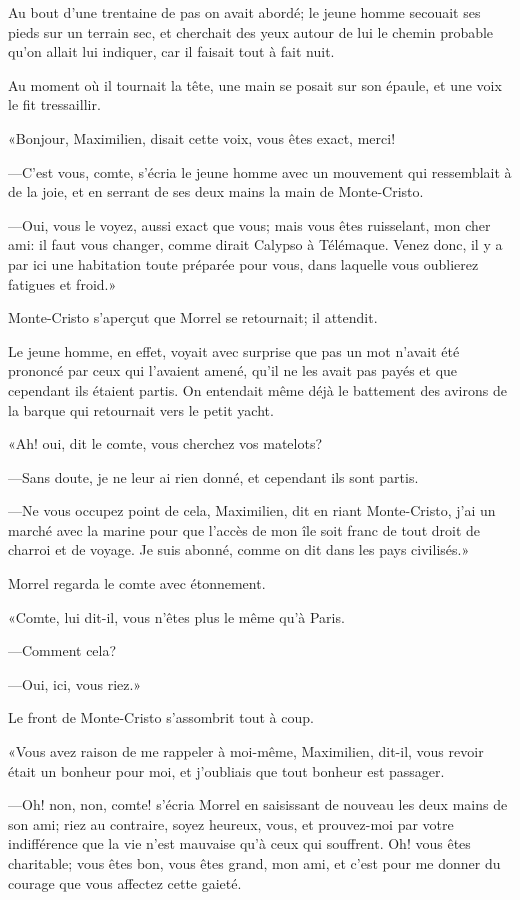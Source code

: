 Au bout d'une trentaine de pas on avait abordé; le jeune homme secouait ses pieds sur un terrain sec, et cherchait des yeux autour de lui le chemin probable qu'on allait lui indiquer, car il faisait tout à fait nuit. 

Au moment où il tournait la tête, une main se posait sur son épaule, et une voix le fit tressaillir. 

«Bonjour, Maximilien, disait cette voix, vous êtes exact, merci! 

—C'est vous, comte, s'écria le jeune homme avec un mouvement qui ressemblait à de la joie, et en serrant de ses deux mains la main de Monte-Cristo. 

—Oui, vous le voyez, aussi exact que vous; mais vous êtes ruisselant, mon cher ami: il faut vous changer, comme dirait Calypso à Télémaque. Venez donc, il y a par ici une habitation toute préparée pour vous, dans laquelle vous oublierez fatigues et froid.» 

Monte-Cristo s'aperçut que Morrel se retournait; il attendit. 

Le jeune homme, en effet, voyait avec surprise que pas un mot n'avait été prononcé par ceux qui l'avaient amené, qu'il ne les avait pas payés et que cependant ils étaient partis. On entendait même déjà le battement des avirons de la barque qui retournait vers le petit yacht. 

«Ah! oui, dit le comte, vous cherchez vos matelots? 

—Sans doute, je ne leur ai rien donné, et cependant ils sont partis. 

—Ne vous occupez point de cela, Maximilien, dit en riant Monte-Cristo, j'ai un marché avec la marine pour que l'accès de mon île soit franc de tout droit de charroi et de voyage. Je suis abonné, comme on dit dans les pays civilisés.» 

Morrel regarda le comte avec étonnement. 

«Comte, lui dit-il, vous n'êtes plus le même qu'à Paris. 

—Comment cela? 

—Oui, ici, vous riez.» 

Le front de Monte-Cristo s'assombrit tout à coup. 

«Vous avez raison de me rappeler à moi-même, Maximilien, dit-il, vous revoir était un bonheur pour moi, et j'oubliais que tout bonheur est passager. 

—Oh! non, non, comte! s'écria Morrel en saisissant de nouveau les deux mains de son ami; riez au contraire, soyez heureux, vous, et prouvez-moi par votre indifférence que la vie n'est mauvaise qu'à ceux qui souffrent. Oh! vous êtes charitable; vous êtes bon, vous êtes grand, mon ami, et c'est pour me donner du courage que vous affectez cette gaieté. 

